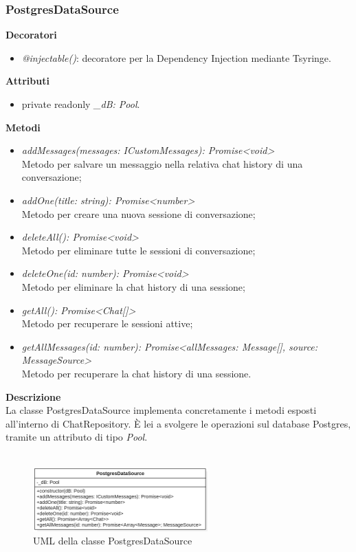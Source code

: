\newpage

\subsubsection{PostgresDataSource}
\textbf{Decoratori}
\begin{itemize}
    \item \textit{@injectable()}: decoratore per la Dependency Injection mediante Tsyringe.
\end{itemize}
\textbf{Attributi}
\begin{itemize}
    \item private readonly \textit{\_dB: Pool}.
\end{itemize}
\textbf{Metodi}
\begin{itemize}[itemsep=-4pt]
    \item \textit{addMessages(messages: ICustomMessages): Promise<void>}\\
    Metodo per salvare un messaggio nella relativa chat history di una conversazione;
    \item \textit{addOne(title: string): Promise<number>}\\
    Metodo per creare una nuova sessione di conversazione;
    \item \textit{deleteAll(): Promise<void>}\\
    Metodo per eliminare tutte le sessioni di conversazione;
    \item \textit{deleteOne(id: number): Promise<void>}\\
    Metodo per eliminare la chat history di una sessione;
    \item \textit{getAll(): Promise<Chat[]>}\\
    Metodo per recuperare le sessioni attive;
    \item \textit{getAllMessages(id: number): Promise<allMessages: Message[], source: MessageSource>}\\
    Metodo per recuperare la chat history di una sessione.
\end{itemize}
\textbf{Descrizione}\\
La classe PostgresDataSource implementa concretamente i metodi esposti all'interno di ChatRepository. È lei a svolgere le operazioni sul database Postgres, tramite un attributo di tipo \textit{Pool}.\\ \\
\begin{figure}[h!]
    \centering  
    \includegraphics[width=0.6\textwidth]{PostgresDataSource.png}
    \caption{UML della classe PostgresDataSource}
\end{figure}

